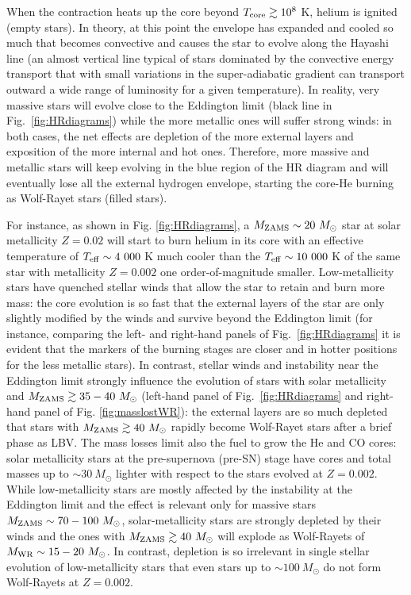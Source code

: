 \documentclass[a4paper,titlepage]{book}     	%
\newcommand{\sun}{\ensuremath{_\odot}}
\newcommand{\mzams}{M_\textup{ZAMS}}
\newcommand{\msun}{\ensuremath{M\sun}}
\begin{document}
When the contraction heats up the core beyond $T_{\rm core} \gtrsim 10^{8}$ K, helium is ignited (empty stars). In theory, at this point the envelope has expanded and cooled so much that becomes convective and causes the star to evolve along the Hayashi line (an almost vertical line typical of stars dominated by the convective energy transport that with small variations in the super-adiabatic gradient can transport outward a wide range of luminosity for a given temperature). In reality, very massive stars will evolve close to the Eddington limit (black line in Fig.\ \ref{fig:HRdiagrams}) while the more metallic ones will suffer strong winds: in both cases, the net effects are depletion of the more external layers and exposition of the more internal and hot ones. Therefore, more massive and metallic stars will keep evolving in the blue region of the HR diagram and will eventually lose all the external hydrogen envelope, starting the core-He burning as Wolf-Rayet stars (filled stars). 

For instance, as shown in Fig. \ref{fig:HRdiagrams}, a $\mzams \sim 20~\msun$ star at solar metallicity $Z=0.02$ will start to burn helium in its core with an effective temperature of $T_{\rm eff} \sim 4~000$ K much cooler than the $T_{\rm eff} \sim 10~000$ K of the same star with metallicity $Z=0.002$ one order-of-magnitude smaller. Low-metallicity stars have quenched stellar winds that allow the star to retain and burn more mass: the core evolution is so fast that the external layers of the star are only slightly modified by the winds and survive beyond the Eddington limit (for instance, comparing the left- and right-hand panels of Fig.\ \ref{fig:HRdiagrams} it is evident that the markers of the burning stages are closer and in hotter positions for the less metallic stars). In contrast, stellar winds and instability near the Eddington limit strongly influence the evolution of stars with solar metallicity and $\mzams \gtrsim 35-40~\msun$ (left-hand panel of Fig.\ \ref{fig:HRdiagrams} and right-hand panel of Fig. \ref{fig:masslostWR}): the external layers are so much depleted that stars with $\mzams \gtrsim 40~\msun$ rapidly become Wolf-Rayet stars after a brief phase as LBV. The mass losses limit also the fuel to grow the He and CO cores: solar metallicity stars at the pre-supernova (pre-SN) stage have cores and total masses up to $\sim 30~\msun$ lighter with respect to the stars evolved at $Z=0.002$. While low-metallicity stars are mostly affected by the instability at the Eddington limit and the effect is relevant only for massive stars $\mzams \sim 70-100~\msun$, solar-metallicity stars are strongly depleted by their winds and the ones with $\mzams \gtrsim 40~\msun$ will explode as Wolf-Rayets of $M_{\rm WR} \sim 15-20~\msun$. In contrast, depletion is so irrelevant in single stellar evolution of low-metallicity stars that even stars up to $\sim 100~\msun$ do not form Wolf-Rayets at $Z=0.002$.\\
\end{document}
